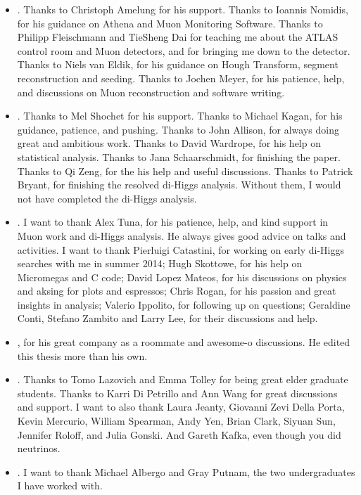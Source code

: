 \begin{itemize}
	\item {}. Thanks to Christoph Amelung for his support. Thanks to Ioannis Nomidis, for his guidance on Athena and Muon Monitoring Software. Thanks to Philipp Fleischmann and TieSheng Dai for teaching me about the ATLAS control room and Muon detectors, and for bringing me down to the detector. Thanks to Niels van Eldik, for his guidance on Hough Transform, segment reconstruction and seeding. Thanks to Jochen Meyer, for his patience, help, and discussions on Muon reconstruction and software writing.
	\item {}. Thanks to Mel Shochet for his support. Thanks to Michael Kagan, for his guidance, patience, and pushing. Thanks to John Allison, for always doing great and ambitious work. Thanks to David Wardrope, for his help on statistical analysis. Thanks to Jana Schaarschmidt, for finishing the paper. Thanks to Qi Zeng, for the his help and useful discussions. Thanks to Patrick Bryant, for finishing the resolved di-Higgs analysis. Without them, I would not have completed the di-Higgs analysis.
	\item {}. I want to thank Alex Tuna, for his patience, help, and kind support in Muon work and di-Higgs analysis. He always gives good advice on talks and activities. I want to thank Pierluigi Catastini, for working on early di-Higgs searches with me in summer 2014; Hugh Skottowe, for his help on Micromegas and C code; David Lopez Mateos, for his discussions on physics and aksing for plots and espressos; Chris Rogan, for his passion and great insights in analysis; Valerio Ippolito, for following up on questions; Geraldine Conti, Stefano Zambito and Larry Lee, for their discussions and help.
	\item {}, for his great company as a roommate and awesome-o discussions. He edited this thesis more than his own.
	\item {}. Thanks to Tomo Lazovich and Emma Tolley for being great elder graduate students. Thanks to Karri Di Petrillo and Ann Wang for great discussions and support. I want to also thank Laura Jeanty, Giovanni Zevi Della Porta, Kevin Mercurio, William Spearman, Andy Yen, Brian Clark, Siyuan Sun, Jennifer Roloff, and Julia Gonski. And Gareth Kafka, even though you did neutrinos.
	\item {}. I want to thank Michael Albergo and Gray Putnam, the two undergraduates I have worked with.

\end{itemize}
